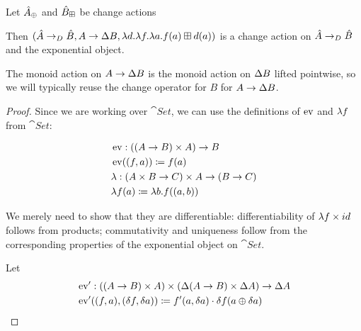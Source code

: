 \begin{prop}[Exponentials]
\label{prop:exponentials}
  Let $\hat{A}_\oplus$ and $\hat{B}_\boxplus$ be change actions

  Then $(\hat{A} \rightarrow_{D} \hat{B},A
    \rightarrow \Delta B,\lambda d. \lambda f. \lambda a. f(a) \boxplus
    d(a))$ is a change action on $\hat{A} \rightarrow_{D} \hat{B}$ and the exponential object.

  The monoid action on $A \rightarrow \Delta B$ is the monoid
  action on $\Delta B$ lifted pointwise, so we will typically reuse the
  change operator for $B$ for $A \rightarrow \Delta B$.
\end{prop}
\ifproofs
\begin{proof}
  Since we are working over $\cat{Set}$, we can use the definitions of $\operatorname{ev}$ and
  $\lambda f$ from $\cat{Set}$:

  \begin{align*}
    &\operatorname{ev} : ((A \rightarrow B) \times A) \rightarrow B\\
    &\operatorname{ev}((f, a)) \coloneqq f(a)\\
    &\lambda : (A \times B \rightarrow C) \times A \rightarrow (B \rightarrow C)\\
    &\lambda f(a) \coloneqq \lambda b. f((a, b))\\
  \end{align*}
  
  We merely need to show that they are differentiable: differentiability of $\lambda f
  \times id$ follows from products; commutativity and
  uniqueness follow from the corresponding properties of the exponential object
  on $\cat{Set}$.

  Let 
  \begin{align*}
    &\operatorname{ev}' : ((A \rightarrow B) \times A) \times (\Delta (A \rightarrow B) \times \Delta A) \rightarrow \Delta A\\
    &\operatorname{ev}'((f, a), (\delta f, \delta a)) \coloneqq f'(a, \delta a) \cdot \delta f(a \oplus \delta a)
  \end{align*}


\end{proof}
